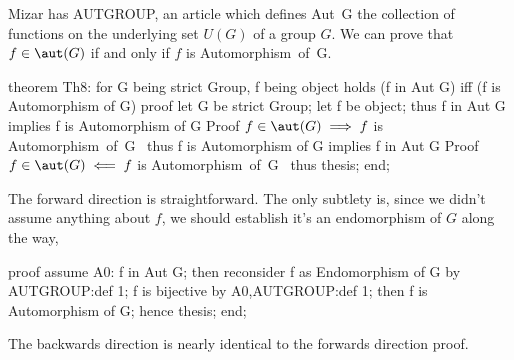\nwendcode{}\nwdocspar

Mizar has {\Tt{}AUTGROUP\nwendquote}, an article which defines {\Tt{}Aut\ G\nwendquote} the
collection of functions on the underlying set $U(G)$ of a group $G$. We
can prove that $f\in\aut(G)$ if and only if $f$ is {\Tt{}Automorphism\ of\ G\nwendquote}.

\nwenddocs{}\endmoddef\nwstartdeflinemarkup{}\nwenddeflinemarkup
theorem Th8:
  for G being strict Group, f being object
  holds (f in Aut G) iff (f is Automorphism of G)
proof
  let G be strict Group;
  let f be object;
  thus f in Aut G implies f is Automorphism of G
  \LA{}Proof $f\in\aut(G)\implies f$ is \code{}Automorphism\ of\ G\edoc{}~{\nwtagstyle{}}\RA{}
  thus f is Automorphism of G implies f in Aut G
  \LA{}Proof $f\in\aut(G)\impliedby f$ is \code{}Automorphism\ of\ G\edoc{}~{\nwtagstyle{}}\RA{}
  thus thesis;
end;

\nwendcode{}\nwdocspar

 The forward direction is
straightforward. The only subtlety is, since we didn't assume anything
about $f$, we should establish it's an endomorphism of $G$ along the way,

\nwenddocs{}\endmoddef\nwstartdeflinemarkup{}\nwenddeflinemarkup
proof
  assume A0: f in Aut G;
  then reconsider f as Endomorphism of G by AUTGROUP:def 1;
  f is bijective by A0,AUTGROUP:def 1;
  then f is Automorphism of G;
  hence thesis;
end;

\nwendcode{}\nwdocspar

 The backwards direction is nearly
identical to the forwards direction proof.

